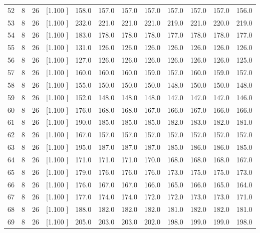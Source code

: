 \documentclass[12pt,a4paper]{article}
\begin{document}
\begin{center}
{\begin{tabular}{r r r r r r r r r r r r}
  52&  8& 26&[1.100     ]&   158.0&   157.0&   157.0&   157.0&   157.0&   157.0&   157.0&   156.0\\[-0.02in]
  53&  8& 26&[1.100     ]&   232.0&   221.0&   221.0&   221.0&   219.0&   221.0&   220.0&   219.0\\[-0.02in]
  54&  8& 26&[1.100     ]&   183.0&   178.0&   178.0&   178.0&   177.0&   178.0&   178.0&   177.0\\[-0.02in]
  55&  8& 26&[1.100     ]&   131.0&   126.0&   126.0&   126.0&   126.0&   126.0&   126.0&   126.0\\[-0.02in]
  56&  8& 26&[1.100     ]&   127.0&   126.0&   126.0&   126.0&   126.0&   126.0&   126.0&   125.0\\[-0.02in]
  57&  8& 26&[1.100     ]&   160.0&   160.0&   160.0&   159.0&   157.0&   160.0&   159.0&   157.0\\[-0.02in]
  58&  8& 26&[1.100     ]&   155.0&   150.0&   150.0&   150.0&   148.0&   150.0&   150.0&   148.0\\[-0.02in]
  59&  8& 26&[1.100     ]&   152.0&   148.0&   148.0&   148.0&   147.0&   147.0&   147.0&   146.0\\[-0.02in]
  60&  8& 26&[1.100     ]&   176.0&   168.0&   168.0&   167.0&   166.0&   167.0&   166.0&   166.0\\[-0.02in]
  61&  8& 26&[1.100     ]&   190.0&   185.0&   185.0&   185.0&   182.0&   183.0&   182.0&   181.0\\[-0.02in]
  62&  8& 26&[1.100     ]&   167.0&   157.0&   157.0&   157.0&   157.0&   157.0&   157.0&   157.0\\[-0.02in]
  63&  8& 26&[1.100     ]&   195.0&   187.0&   187.0&   187.0&   185.0&   186.0&   186.0&   185.0\\[-0.02in]
  64&  8& 26&[1.100     ]&   171.0&   171.0&   171.0&   170.0&   168.0&   168.0&   168.0&   167.0\\[-0.02in]
  65&  8& 26&[1.100     ]&   179.0&   176.0&   176.0&   176.0&   173.0&   175.0&   175.0&   173.0\\[-0.02in]
  66&  8& 26&[1.100     ]&   176.0&   167.0&   167.0&   166.0&   165.0&   166.0&   165.0&   164.0\\[-0.02in]
  67&  8& 26&[1.100     ]&   177.0&   174.0&   174.0&   172.0&   172.0&   173.0&   173.0&   171.0\\[-0.02in]
  68&  8& 26&[1.100     ]&   188.0&   182.0&   182.0&   182.0&   181.0&   182.0&   182.0&   181.0\\[-0.02in]
  69&  8& 26&[1.100     ]&   205.0&   203.0&   203.0&   202.0&   198.0&   199.0&   199.0&   198.0\\[-0.02in]

\end{tabular}}
\end{center}
\end{document}
